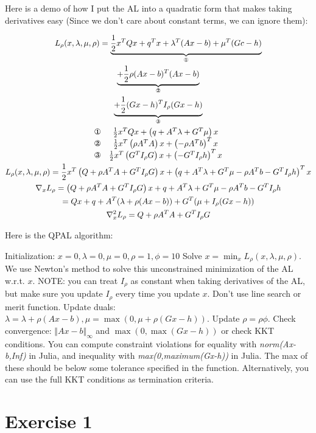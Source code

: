 Here is a demo of how I put the AL into a quadratic form that makes taking derivatives easy (Since we don't care about constant terms, we can ignore them):

\begin{gather*}
    L_{\rho }( x,\lambda ,\mu ,\rho ) =\underbrace{\frac{1}{2} x^{T} Qx+q^{T} x+\lambda ^{T}( Ax-b) +\mu ^{T}( Gc-h)}_{\text{\ding{172}}}\\
    \underbrace{+\frac{1}{2} \rho ( Ax-b)^{T}( Ax-b)}_{\text{\ding{173}}}\\
    \underbrace{+\frac{1}{2}( Gx-h)^{T} I_{\rho }( Gx-h)}_{\text{\ding{174}}}\\
    \begin{matrix}
    \text{\ding{172}} & \frac{1}{2} x^{T} Qx+\left( q+A^{T} \lambda +G^{T} \mu \right) x\\
    \text{\ding{173}} & \frac{1}{2} x^{T}\left( \rho A^{T} A\right) x+\left( -\rho A^{T} b\right)^{T} x\\
    \text{\ding{174}} & \frac{1}{2} x^{T}\left( G^{T} I_{\rho } G\right) x+\left( -G^{T} I_{\rho } h\right)^{T} x
    \end{matrix}\\
    L_{\rho }( x,\lambda ,\mu ,\rho ) =\frac{1}{2} x^{T}\left( Q+\rho A^{T} A+G^{T} I_{\rho } G\right) x+\left( q+A^{T} \lambda +G^{T} \mu -\rho A^{T} b-G^{T} I_{\rho } h\right)^{T} x\\
    \nabla _{x} L_{\rho } =\left( Q+\rho A^{T} A+G^{T} I_{\rho } G\right) x+q+A^{T} \lambda +G^{T} \mu -\rho A^{T} b-G^{T} I_{\rho } h\\
    =Qx+q+A^{T}( \lambda +\rho ( Ax-b)) +G^{T}( \mu +I_{\rho }( Gx-h))\\
    \nabla _{x}^{2} L_{\rho } =Q+\rho A^{T} A+G^{T} I_{\rho } G
\end{gather*}

Here is the QPAL algorithm:
\begin{algorithmic}[1]
    \STATE Initialization: $x=0,\lambda=0,\mu=0,\rho=1,\phi=10$
      \STATE Solve $x=\min_x L_\rho(x,\lambda,\mu,\rho)$. We use Newton's method to solve this unconstrained minimization of the AL w.r.t. $x$. NOTE: you can treat $I_\rho$ as constant when taking derivatives of the AL, but make sure you update $I_\rho$ every time you update $x$. Don't use line search or merit function.
      \STATE Update duals: $\lambda=\lambda+\rho(Ax-b),\mu=\max(0,\mu+\rho(Gx-h))$.
      \STATE Update $\rho=\rho\phi$.
      \STATE Check convergence: $\Vert Ax-b \Vert_\infty$ and $\max(0, \max(Gx-h))$ or check KKT conditions. You can compute constraint violations for equality with \textit{norm(Ax-b,Inf)} in Julia, and inequality with \textit{max(0,maximum(Gx-h))} in Julia. The max of these should be below some tolerance specified in the function. Alternatively, you can use the full KKT conditions as termination criteria.
    \ENDWHILE
\end{algorithmic}
\section{Exercise 1}